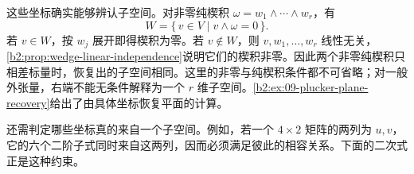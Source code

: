 \ProseParagraphBreak
这些坐标确实能够辨认子空间。对非零纯楔积 \(\omega=w_1\wedge\cdots\wedge w_r\)，有
\begin{equation}\label{b2:eq:plucker-recovers-plane}
	W=\{\,v\in V\mid v\wedge\omega=0\,\}.
\end{equation}
若 \(v\in W\)，按 \(w_j\) 展开即得楔积为零。若 \(v\notin W\)，则 \(v,w_1,\ldots,w_r\) 线性无关，\cref{b2:prop:wedge-linear-independence}说明它们的楔积非零。因此两个非零纯楔积只相差标量时，恢复出的子空间相同。这里的非零与纯楔积条件都不可省略；对一般外张量，右端不能无条件解释为一个 \(r\) 维子空间。\cref{b2:ex:09-plucker-plane-recovery}给出了由具体坐标恢复平面的计算。

\ProseParagraphBreak
还需判定哪些坐标真的来自一个子空间。例如，若一个 \(4\times2\) 矩阵的两列为 \(u,v\)，它的六个二阶子式同时来自这两列，因而必须满足彼此的相容关系。下面的二次式正是这种约束。

